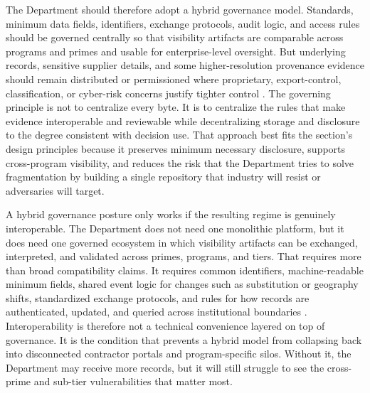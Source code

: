 The Department should therefore adopt a hybrid governance model. Standards, minimum data fields, identifiers, exchange protocols, audit logic, and access rules should be governed centrally so that visibility artifacts are comparable across programs and primes and usable for enterprise-level oversight. But underlying records, sensitive supplier details, and some higher-resolution provenance evidence should remain distributed or permissioned where proprietary, export-control, classification, or cyber-risk concerns justify tighter control \parencite{ch5_nist800161r1upd1,ch5_dbb2025_illumination,ch5_farsubpart423,ch5_dscsa_interop_2023,ch5_nist_ir_8419}. The governing principle is not to centralize every byte. It is to centralize the rules that make evidence interoperable and reviewable while decentralizing storage and disclosure to the degree consistent with decision use. That approach best fits the section's design principles because it preserves minimum necessary disclosure, supports cross-program visibility, and reduces the risk that the Department tries to solve fragmentation by building a single repository that industry will resist or adversaries will target.

A hybrid governance posture only works if the resulting regime is genuinely interoperable. The Department does not need one monolithic platform, but it does need one governed ecosystem in which visibility artifacts can be exchanged, interpreted, and validated across primes, programs, and tiers. That requires more than broad compatibility claims. It requires common identifiers, machine-readable minimum fields, shared event logic for changes such as substitution or geography shifts, standardized exchange protocols, and rules for how records are authenticated, updated, and queried across institutional boundaries \parencite{ch5_nist800161r1upd1,ch5_dscsa_interop_2023,ch5_ntia_sbom_2021,ch5_nist_ir_8536_2,ch5_nist_ir_8419}. Interoperability is therefore not a technical convenience layered on top of governance. It is the condition that prevents a hybrid model from collapsing back into disconnected contractor portals and program-specific silos. Without it, the Department may receive more records, but it will still struggle to see the cross-prime and sub-tier vulnerabilities that matter most.

